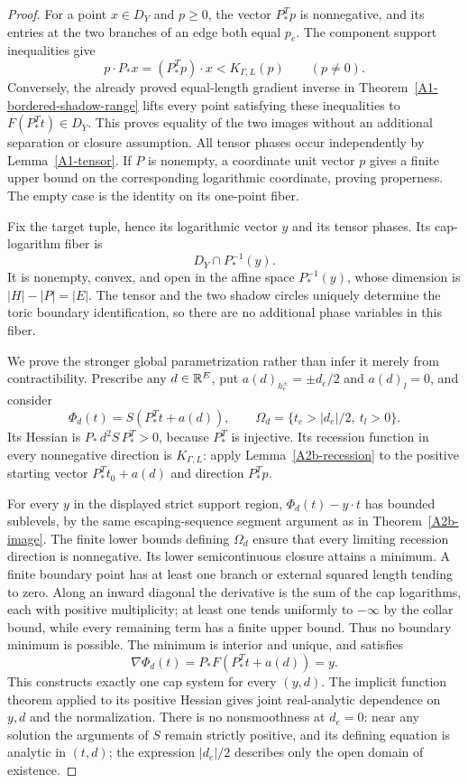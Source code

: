 \begin{proof}
For a point $x\in D_Y$ and $p\geq0$, the vector $P_*^Tp$ is
nonnegative, and its entries at the two branches of an edge both
equal $p_e$. The component support inequalities give
\[
 p\cdot P_*x=(P_*^Tp)\cdot x<K_{\Gamma,L}(p)
 \qquad(p\ne0).
\]
Conversely, the already proved equal-length gradient inverse in
Theorem~\ref{A1-bordered-shadow-range} lifts every point satisfying
these inequalities to $F(P_*^Tt)\in D_Y$. This proves equality of
the two images without an additional separation or closure
assumption. All tensor phases occur independently by
Lemma~\ref{A1-tensor}. If $P$ is nonempty, a coordinate unit
vector $p$ gives a finite upper bound on the corresponding
logarithmic coordinate, proving properness. The empty case is
the identity on its one-point fiber.

Fix the target tuple, hence its logarithmic vector $y$ and its
tensor phases. Its cap-logarithm fiber is
\[
 D_Y\cap P_*^{-1}(y).
\]
It is nonempty, convex, and open in the affine space
$P_*^{-1}(y)$, whose dimension is
$|H|-|P|=|E|$. The tensor and the two shadow circles uniquely
determine the toric boundary identification, so there are no
additional phase variables in this fiber.

We prove the stronger global parametrization rather than infer it
merely from contractibility. Prescribe any $d\in{\ensuremath{\mathbb{R}}}^E$, put
$a(d)_{h_e^\pm}=\pm d_e/2$ and $a(d)_l=0$, and consider
\[
 \Phi_d(t)=S(P_*^Tt+a(d)),\qquad
 \Omega_d=\{t_e>|d_e|/2,\ t_l>0\}.
\]
Its Hessian is $P_*\,d^2S\,P_*^T>0$, because $P_*^T$ is
injective. Its recession function in every nonnegative direction
is $K_{\Gamma,L}$: apply Lemma~\ref{A2b-recession} to the positive
starting vector $P_*^Tt_0+a(d)$ and direction $P_*^Tp$.

For every $y$ in the displayed strict support region,
$\Phi_d(t)-y\cdot t$ has bounded sublevels, by the same
escaping-sequence segment argument as in
Theorem~\ref{A2b-image}. The finite lower bounds defining
$\Omega_d$ ensure that every limiting recession direction is
nonnegative. Its lower semicontinuous closure attains a minimum.
A finite boundary point has at least one branch or external
squared length tending to zero. Along an inward diagonal the
derivative is the sum of the cap logarithms, each with positive
multiplicity; at least one tends uniformly to $-\infty$ by the
collar bound, while every remaining term has a finite upper bound.
Thus no boundary minimum is possible. The minimum is interior
and unique, and satisfies
\[
             \nabla\Phi_d(t)=P_*F(P_*^Tt+a(d))=y.
\]
This constructs exactly one cap system for every $(y,d)$. The
implicit function theorem applied to its positive Hessian gives
joint real-analytic dependence on $y,d$ and the normalization.
There is no nonsmoothness at $d_e=0$: near any solution the
arguments of $S$ remain strictly positive, and its defining
equation is analytic in $(t,d)$; the expression $|d_e|/2$
describes only the open domain of existence.


\end{proof}
